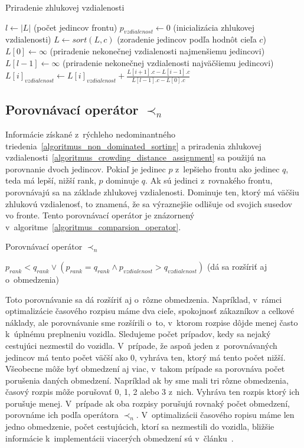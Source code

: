 \begin{algorithm}[h]\label{algoritmus_crowding_distance_assignment}
\caption{Priradenie zhlukovej vzdialenosti}
  $l \gets |L|$ (počet jedincov frontu)\;
   {
    $p_{vzdialenost} \gets 0$ (inicializácia zhlukovej vzdialenosti)\;
  }
   {
    $L \gets sort(L, c)$ (zoradenie jedincov podľa hodnôt cieľa $c$)\;
    $L[0] \gets \infty$ (priradenie nekonečnej vzdialenosti najmenšiemu jedincovi)\;
    $L[l-1] \gets \infty$ (priradenie nekonečnej vzdialenosti najväčšiemu jedincovi)\;
     {
      $L[i]_{vzdialenost} \gets L[i]_{vzdialenost} + \frac{L[i+1].c - L[i-1].c}{L[l-1].c - L[0].c}$\;
    }
  }
\end{algorithm}

\subsection*{Porovnávací operátor $\prec_n$}
Informácie získané z~rýchleho nedominantného triedenia~\ref{algoritmus_non_dominated_sorting} a priradenia zhlukovej vzdialenosti~\ref{algoritmus_crowding_distance_assignment} sa použijú na porovnanie dvoch jedincov.
Pokiaľ je jedinec $p$ z~lepšieho frontu ako jedinec $q$, teda má lepší, nižší rank, $p$ dominuje $q$.
Ak sú jedinci z~rovnakého frontu, porovnávajú sa na základe zhlukovej vzdialenosti.
Dominuje ten, ktorý má väčšiu zhlukovú vzdialenosť, to znamená, že sa výraznejšie odlišuje od svojich susedov vo fronte.
Tento porovnávací operátor je znázornený v~algoritme~\ref{algoritmus_comparsion_operator}.

\begin{algorithm}[h]\label{algoritmus_comparsion_operator}
\caption{Porovnávací operátor $\prec_n$}
  \Return $p_{rank} < q_{rank} \vee (p_{rank} = q_{rank} \wedge p_{vzdialenost} > q_{vzdialenost})$\;
  (dá sa rozšíriť aj o~obmedzenia)\;
\end{algorithm}

Toto porovnávanie sa dá rozšíriť aj o~rôzne obmedzenia.
Napríklad, v~rámci optimalizácie časového rozpisu máme dva cieľe, spokojnosť zákazníkov a celkové náklady, ale porovnávanie sme rozšírili o~to, v~ktorom rozpise dôjde menej často k~úplnému preplneniu vozidla.
Sledujeme počet prípadov, kedy sa nejaký cestujúci nezmestil do vozidla.
V~prípade, že aspoň jeden z~porovnávaných jedincov má tento počet väčší ako 0, vyhráva ten, ktorý má tento počet nižší.
Všeobecne môže byť obmedzení aj viac, v~takom prípade sa porovnáva počet porušenia daných obmedzení.
Napríklad ak by sme mali tri rôzne obmedzenia, časový rozpis môže porušovať 0, 1, 2 alebo 3 z~nich.
Vyhráva ten rozpis ktorý ich porušuje menej.
V~prípade ak oba rozpisy porušujú rovnaký počet obmedzení, porovnáme ich podľa operátora $\prec_n$.
V~optimalizácii časového ropisu máme len jedno obmedzenie, počet cestujúcich, ktorí sa nezmestili do vozidla, bližšie informácie k~implementácii viacerých obmedzení sú v~článku~\cite{deb2002nsga}.

